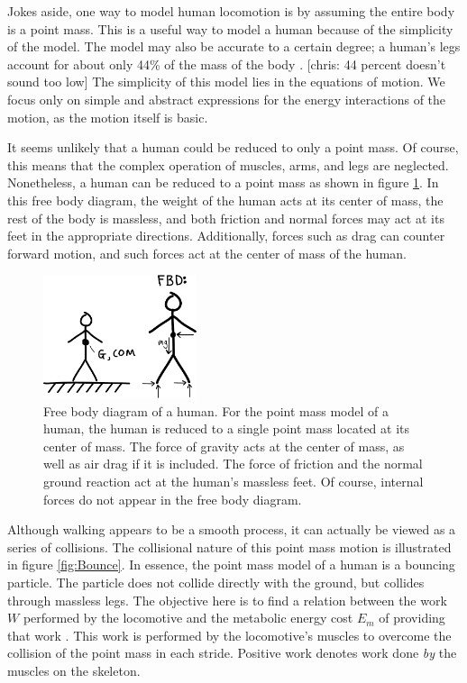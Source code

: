 Jokes aside, one way to model human locomotion is by assuming the entire body is a point mass. This is a useful way to model a human because of the simplicity of the model. The model may also be accurate to a certain degree; a human's legs account for about only 44\% of the mass of the body \cite{winter92}.
[chris: 44 percent doesn't sound too low] The simplicity of this model lies in the equations of motion. We focus only on simple and abstract expressions for the energy interactions of the motion, as the motion itself is basic. 

It seems unlikely that a human could be reduced to only a point mass. Of course, this means that the complex operation of muscles, arms, and legs are neglected. Nonetheless, a human can be reduced to a point mass as shown in figure \ref{fig:PersonFBD}. In this free body diagram, the weight of the human acts at its center of mass, the rest of the body is massless, and both friction and normal forces may act at its feet in the appropriate directions. Additionally, forces such as drag can counter forward motion, and such forces act at the center of mass of the human. 

\begin{figure}[h]		%
\begin{centering}
\includegraphics[width=0.4\textwidth]{Figures/PersonFBD}\par
\end{centering}
\caption[Diagram: Free Body Diagram of a Human]{Free body diagram of a human. For the point mass model of a human, the human is reduced to a single point mass located at its center of mass. The force of gravity acts at the center of mass, as well as air drag if it is included. The force of friction and the normal ground reaction act at the human's massless feet. Of course, internal forces do not appear in the free body diagram.}
\label{fig:PersonFBD}
\end{figure}
%

Although walking appears to be a smooth process, it can actually be viewed as a series of collisions. The collisional nature of this point mass motion is illustrated in figure \ref{fig:Bounce}. In essence, the point mass model of a human is a bouncing particle. The particle does not collide directly with the ground, but collides through massless legs. The objective here is to find a relation between the work $W$ performed by the locomotive and the metabolic energy cost $E_{m}$ of providing that work \cite{ruina05}. This work is performed by the locomotive's muscles to overcome the collision of the point mass in each stride. Positive work denotes work done \emph{by} the muscles on the skeleton.

